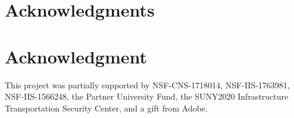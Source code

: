 \documentclass[10pt,journal,compsoc]{IEEEtran}
\begin{document}
%





\ifCLASSOPTIONcompsoc
  \section*{Acknowledgments}
\else
  \section*{Acknowledgment}
\fi


This project was partially supported by NSF-CNS-1718014, NSF-IIS-1763981, NSF-IIS-1566248, the Partner University Fund, the SUNY2020 Infrastructure Transportation Security Center, and a gift from Adobe.





\ifCLASSOPTIONcaptionsoff
  \newpage
\fi



\end{document}
